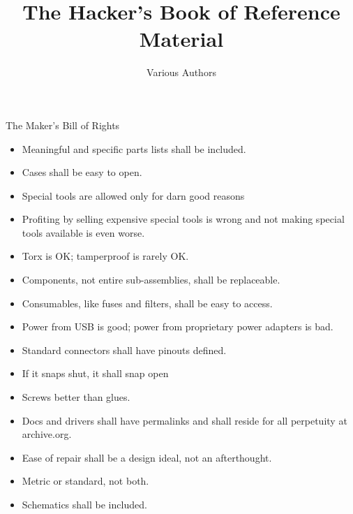 \documentclass{article}
\title{The Hacker's Book of Reference Material}
\author{Various Authors}
\date{}
\begin{document}
\setmainfont{Gentium Book Basic}
\centering
The Maker's Bill of Rights
\begin{itemize}
    \item Meaningful and specific parts lists shall be included.
    \item Cases shall be easy to open.
    \item Special tools are allowed only for darn good reasons
    \item Profiting by selling expensive special tools is wrong and not making special tools available is even worse.
    \item Torx is OK; tamperproof is rarely OK.
    \item Components, not entire sub-assemblies, shall be replaceable.
    \item Consumables, like fuses and filters, shall be easy to access.
    \item Power from USB is good; power from proprietary power adapters is bad.
    \item Standard connectors shall have pinouts defined.
    \item If it snaps shut, it shall snap open
    \item Screws better than glues.
    \item Docs and drivers shall have permalinks and shall reside for all perpetuity at archive.org.
    \item Ease of repair shall be a design ideal, not an afterthought.
    \item Metric or standard, not both.
    \item Schematics shall be included.
\end{itemize}
\end{document}
